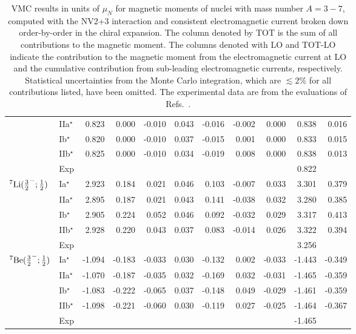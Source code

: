 \documentclass[aps,prc,floatfix,showpacs,twocolumn, preprintnumbers]{revtex4-2}
\begin{document}
\begin{table}[tbh]
\begin{center}
\begin{tabular} {l l *{9}{d{3.3}}}
 &IIa$^{\star}$ &0.823 & 0.000 &-0.010 &0.043 &-0.016 &-0.002 &0.000 &0.838 &0.016\\
&Ib$^{\star}$ &0.820 &0.000 &-0.010 &0.037 &-0.015 &0.001 &0.000 &0.833 &0.015 \\
&IIb$^{\star}$ &0.825 &0.000 &-0.010 &0.034 &-0.019 &0.008 &0.000 &0.838 &0.013 \\
&Exp & & & & & & & &0.822 &\\
\hline
$^7{\rm Li}(\frac{3}{2}^-;\frac{1}{2})$ &Ia$^{\star}$ &2.923 &0.184 &0.021 &0.046 &0.103 &-0.007 &0.033 &3.301 &0.379\\
&IIa$^{\star}$ &2.895 &0.187 &0.021 &0.043 &0.141 &-0.038 &0.032 &3.280 &0.385\\
&Ib$^{\star}$ &2.905 &0.224 &0.052 &0.046 &0.092 &-0.032 &0.029 &3.317 &0.413\\
&IIb$^{\star}$ &2.928 &0.220 &0.043 &0.037 &0.083 &-0.014 &0.026 &3.322 &0.394\\
&Exp & & & & & & & &3.256 &\\
\hline
$^7{\rm Be}(\frac{3}{2}^-;\frac{1}{2})$ &Ia$^{\star}$ &-1.094 &-0.183 &-0.033 &0.030 &-0.132 &0.002 &-0.033 &-1.443 &-0.349\\
&IIa$^{\star}$ &-1.070 &-0.187 &-0.035 &0.032 &-0.169 &0.032 &-0.031 &-1.465 &-0.359\\
&Ib$^{\star}$ &-1.083 &-0.222 &-0.065 &0.037 &-0.148 &0.049 &-0.029 &-1.461 &-0.359\\
&IIb$^{\star}$ &-1.098 &-0.221 &-0.060 &0.030 &-0.119 &0.027 &-0.025 &-1.464 &-0.367\\
&Exp & & & & & & & &-1.465 &\\
 \hline \hline
\end{tabular}
\end{center}
\caption{VMC results in units of $\mu_N$ for magnetic moments of nuclei with mass number $A=3-7$, computed with the NV2+3 interaction and consistent electromagnetic current broken down order-by-order in the chiral expansion. The column denoted by TOT is the sum of all contributions to the magnetic moment. The columns denoted with LO and TOT-LO indicate the contribution to the magnetic moment from the electromagnetic current at LO and the cumulative contribution from sub-leading electromagnetic currents, respectively. Statistical uncertainties from the Monte Carlo integration, which are $\lesssim 2\%$ for all contributions listed, have been omitted. The experimental data are from the evaluations of Refs.~\cite{Purcell:2010hka,Tilley:2002vg,Tilley:2004zz,Borremans:2005ar}.}
\label{tab:vmc.mm.light37}
\end{table}
\end{document}
